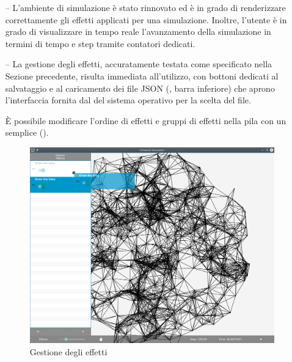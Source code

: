                 \begin{itemize}
                  \item[--]
                      L'ambiente di simulazione è stato rinnovato ed è in grado di renderizzare correttamente gli effetti applicati per una simulazione.
                      Inoltre, l'utente è in grado di visualizzare in tempo reale l'avanzamento della simulazione in termini di tempo e step tramite contatori dedicati.

                  \item[--]
                      La gestione degli effetti, accuratamente testata come specificato nella %
                      Sezione precedente, risulta immediata all'utilizzo, con bottoni dedicati al salvataggio e al caricamento dei file JSON (, barra inferiore) che aprono l'interfaccia fornita dal  del sistema operativo per la scelta del file.

                      È possibile modificare l'ordine di effetti e gruppi di effetti nella pila con un semplice  ().

                      \begin{figure}[htbp]
                          \centering
                          \includegraphics[scale=0.44]{img/withNodes/simWithDnD}
                          \caption{Gestione  degli effetti}
                          \label{fig:simWithDnD}
                      \end{figure}


\end{itemize}

